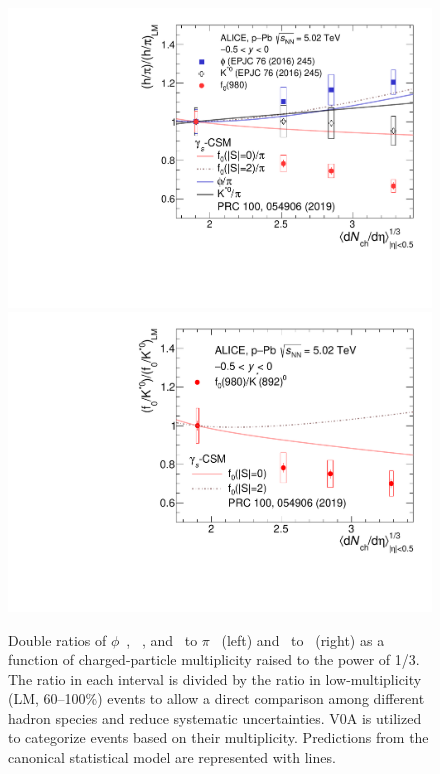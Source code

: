\begin{figure}[!hbt]
	\centering
	\includegraphics[width=0.49 \textwidth]{figures/Fig4_DR_pion.pdf} 
        \includegraphics[width=0.49 \textwidth]{figures/Fig5_DR_Kstar.pdf} 
	\caption{ Double ratios of $\phi$~\cite{ALICE:2016sak}, \kstar~\cite{ALICE:2016sak}, and \fzero~to $\pi$~\cite{ALICE:2016dei} (left) and \fzero~to \kstar~(right) as a function of charged-particle multiplicity raised to the power of 1/3. The ratio in each interval is divided by the ratio in low-multiplicity (LM, 60--100\%) events to allow a direct comparison among different hadron species and reduce systematic uncertainties. V0A is utilized to categorize events based on their multiplicity. Predictions from the canonical statistical model are represented with lines. }
	\label{fig:f0piAddCSM}
\end{figure}

